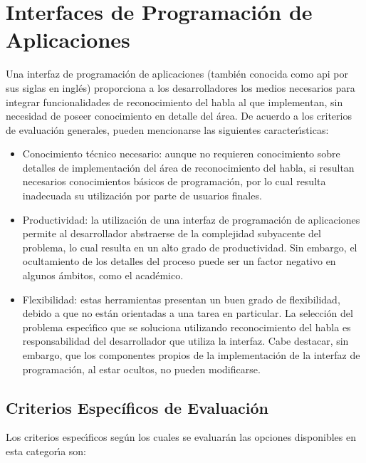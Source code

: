 \section{Interfaces de Programaci\'on de Aplicaciones}
\label{apis}


Una interfaz de programaci\'on de aplicaciones (tambi\'en conocida como \gls{api} por sus siglas 
en ingl\'es) proporciona a los desarrolladores los medios necesarios para integrar funcionalidades de
reconocimiento del habla al  que implementan, sin necesidad de poseer
conocimiento en detalle del \'area. De acuerdo a los criterios de evaluaci\'on generales, 
pueden mencionarse las siguientes caracter{\'\i}sticas:

\begin{itemize}
 	\item Conocimiento t\'ecnico necesario: aunque no requieren conocimiento sobre detalles de implementaci\'on
 	del \'area de reconocimiento del habla, si resultan necesarios conocimientos b\'asicos de
 	programaci\'on, por lo cual resulta inadecuada su utilizaci\'on por parte de usuarios finales.
 	\item Productividad: la utilizaci\'on de una interfaz de programaci\'on de aplicaciones permite
 	al desarrollador abstraerse de la complejidad subyacente del problema, lo cual resulta en
 	un alto grado de productividad. Sin embargo, el ocultamiento de los detalles del proceso
 	puede ser un factor negativo en algunos \'ambitos, como el \mbox{acad\'emico}.
 	\item Flexibilidad: estas herramientas presentan un buen grado de flexibilidad, debido a
 	que no est\'an orientadas a una tarea en particular. La selecci\'on del problema espec{\'\i}fico
 	que se soluciona utilizando reconocimiento del habla es responsabilidad del desarrollador
 	que utiliza la interfaz. Cabe destacar, sin embargo, que los componentes propios de la
 	implementaci\'on de la interfaz de programaci\'on, al estar ocultos, no
 	pueden modificarse.
 \end{itemize}


\subsection{Criterios Espec\'ificos de Evaluaci\'on}

Los criterios espec{\'\i}ficos seg\'un los cuales se evaluar\'an las opciones disponibles en esta
categor{\'\i}a son:

